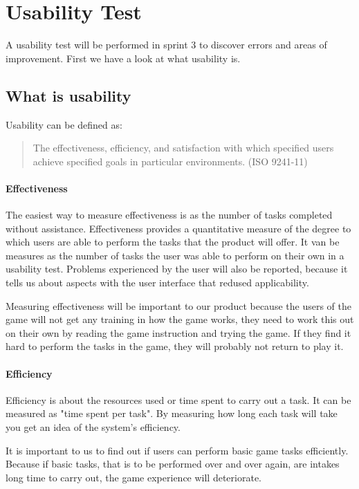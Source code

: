 \section{Usability Test}

A usability test will be performed in sprint 3 to discover errors and areas of improvement. First we have a look at what usability is.

\subsection{What is usability}

Usability can be defined as:

\begin{quote}
The effectiveness, efficiency, and satisfaction with which specified users 
achieve specified goals in particular environments. (ISO 9241-11)
\end{quote}

\paragraph{Effectiveness}

The easiest way to measure effectiveness is as the number of tasks completed without assistance. Effectiveness provides a quantitative measure of the degree to which users are able to perform the tasks that the product will offer. It van be measures as the number of tasks the user was able to perform on their own in a usability test. Problems experienced by the user will also be reported, because it tells us about aspects with the user interface that redused applicability.

Measuring effectiveness will be important to our product because the users of the game will not get any training in how the game works, they need to work this out on their own by reading the game instruction and trying the game. If they find it hard to perform the tasks in the game, they will probably not return to play it.

\paragraph{Efficiency}

Efficiency is about the resources used or time spent to carry out a task. It can be measured as "time spent per task".
By measuring how long each task will take you get an idea of the system's efficiency.

It is important to us to find out if users can perform basic game tasks efficiently. Because if basic tasks, that is to be performed over and over again, are intakes long time to carry out, the game experience will deteriorate.

